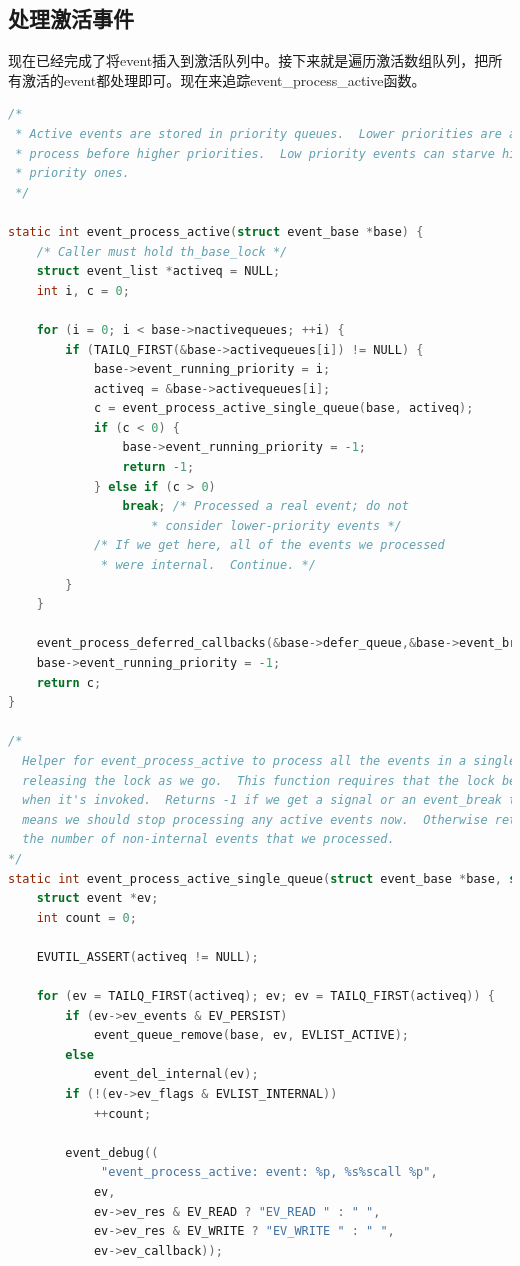 \documentclass[11pt,a4paper]{article}
\begin{document}
\subsection{处理激活事件}
现在已经完成了将event插入到激活队列中。接下来就是遍历激活数组队列，把所有激活的event都处理即可。现在来追踪event\_process\_active函数。

\begin{lstlisting}[language=C]
/*
 * Active events are stored in priority queues.  Lower priorities are always
 * process before higher priorities.  Low priority events can starve high
 * priority ones.
 */

static int event_process_active(struct event_base *base) {
	/* Caller must hold th_base_lock */
	struct event_list *activeq = NULL;
	int i, c = 0;

	for (i = 0; i < base->nactivequeues; ++i) {
		if (TAILQ_FIRST(&base->activequeues[i]) != NULL) {
			base->event_running_priority = i;
			activeq = &base->activequeues[i];
			c = event_process_active_single_queue(base, activeq);
			if (c < 0) {
				base->event_running_priority = -1;
				return -1;
			} else if (c > 0)
				break; /* Processed a real event; do not
					* consider lower-priority events */
			/* If we get here, all of the events we processed
			 * were internal.  Continue. */
		}
	}

	event_process_deferred_callbacks(&base->defer_queue,&base->event_break);
	base->event_running_priority = -1;
	return c;
}

/*
  Helper for event_process_active to process all the events in a single queue,
  releasing the lock as we go.  This function requires that the lock be held
  when it's invoked.  Returns -1 if we get a signal or an event_break that
  means we should stop processing any active events now.  Otherwise returns
  the number of non-internal events that we processed.
*/
static int event_process_active_single_queue(struct event_base *base, struct event_list *activeq) {
	struct event *ev;
	int count = 0;

	EVUTIL_ASSERT(activeq != NULL);

	for (ev = TAILQ_FIRST(activeq); ev; ev = TAILQ_FIRST(activeq)) {
		if (ev->ev_events & EV_PERSIST)
			event_queue_remove(base, ev, EVLIST_ACTIVE);
		else
			event_del_internal(ev);
		if (!(ev->ev_flags & EVLIST_INTERNAL))
			++count;

		event_debug((
			 "event_process_active: event: %p, %s%scall %p",
			ev,
			ev->ev_res & EV_READ ? "EV_READ " : " ",
			ev->ev_res & EV_WRITE ? "EV_WRITE " : " ",
			ev->ev_callback));


\end{lstlisting}
\end{document}
